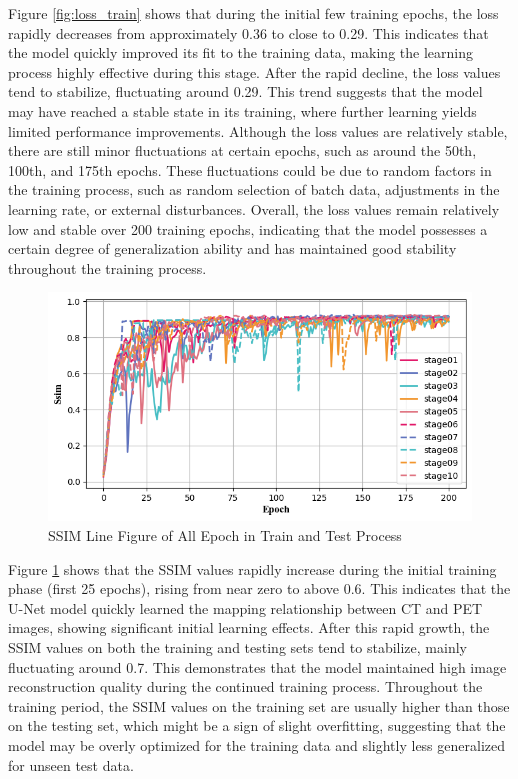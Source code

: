 \documentclass[twocolumn]{article}
\begin{document}
Figure \ref{fig:loss_train} shows that during the initial few training epochs, the loss rapidly decreases from approximately 0.36 to close to 0.29. This indicates that the model quickly improved its fit to the training data, making the learning process highly effective during this stage. After the rapid decline, the loss values tend to stabilize, fluctuating around 0.29. This trend suggests that the model may have reached a stable state in its training, where further learning yields limited performance improvements. Although the loss values are relatively stable, there are still minor fluctuations at certain epochs, such as around the 50th, 100th, and 175th epochs. These fluctuations could be due to random factors in the training process, such as random selection of batch data, adjustments in the learning rate, or external disturbances. Overall, the loss values remain relatively low and stable over 200 training epochs, indicating that the model possesses a certain degree of generalization ability and has maintained good stability throughout the training process.


\begin{figure}[h]
	\centering
	\includegraphics[width=1.0\linewidth]{u-net/lung/csv_img_in_1_img_8_4/ssim_comparison}
	\caption[ssim]{SSIM Line Figure of All Epoch in Train and Test Process}
	\label{fig:ssim}
\end{figure}

Figure \ref{fig:ssim} shows that the SSIM values rapidly increase during the initial training phase (first 25 epochs), rising from near zero to above 0.6. This indicates that the U-Net model quickly learned the mapping relationship between CT and PET images, showing significant initial learning effects. After this rapid growth, the SSIM values on both the training and testing sets tend to stabilize, mainly fluctuating around 0.7. This demonstrates that the model maintained high image reconstruction quality during the continued training process. Throughout the training period, the SSIM values on the training set are usually higher than those on the testing set, which might be a sign of slight overfitting, suggesting that the model may be overly optimized for the training data and slightly less generalized for unseen test data.
\end{document}
